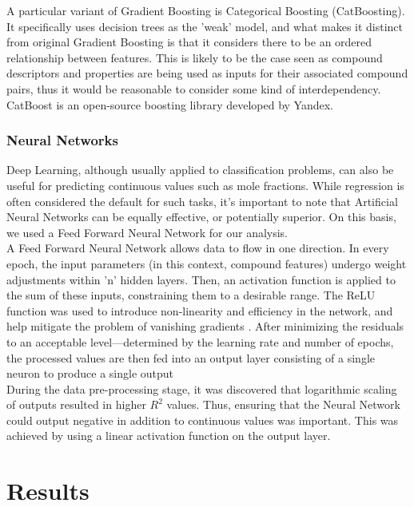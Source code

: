 \documentclass[11pt, titlepage]{article}
\begin{document}
A particular variant of Gradient Boosting is Categorical Boosting (CatBoosting). It specifically uses decision trees as the 'weak' model, and what makes it distinct from original Gradient Boosting is that it considers there to be an ordered relationship between features. This is likely to be the case seen as compound descriptors and properties are being used as inputs for their associated compound pairs, thus it would be reasonable to consider some kind of interdependency. CatBoost is an open-source boosting library developed by Yandex\cite{catboost}. 

\subsubsection{Neural Networks}
Deep Learning, although usually applied to classification problems, can also be useful for predicting continuous values such as mole fractions. While regression is often considered the default for such tasks, it's important to note that Artificial Neural Networks can be equally effective, or potentially superior. On this basis, we used a Feed Forward Neural Network for our analysis. \cite{DNN1} \\

A Feed Forward Neural Network allows data to flow in one direction. In every epoch, the input parameters (in this context, compound features) undergo weight adjustments within 'n' hidden layers. Then, an activation function is applied to the sum of these inputs, constraining them to a desirable range. The ReLU function was used to introduce non-linearity and efficiency in the network, and help mitigate the problem of vanishing gradients \cite{DNN2}. After minimizing the residuals to an acceptable level—determined by the learning rate and number of epochs, the processed values are then fed into an output layer consisting of a single neuron to produce a single output \\

During the data pre-processing stage, it was discovered that logarithmic scaling of outputs resulted in higher $R^2$ values. Thus, ensuring that the Neural Network could output negative in addition to continuous values was important. This was achieved by using a linear activation function on the output layer.
\newpage
\section{Results}
\label{section:results}
\end{document}
